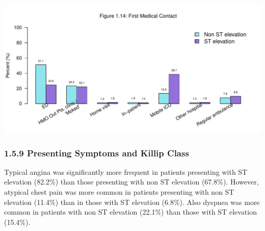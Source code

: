 \documentclass[
]{article}
\begin{document}
\includegraphics{‏‏ACSIS_2024_v1_with_trend_pdf_files/figure-latex/unnamed-chunk-48-1.pdf}

\pagebreak

\subsubsection{1.5.9 Presenting Symptoms and Killip
Class}\label{presenting-symptoms-and-killip-class}

Typical angina was significantly more frequent in patients presenting
with ST elevation (82.2\%) than those presenting with non ST elevation
(67.8\%). However, atypical chest pain was more common in patients
presenting with non ST elevation (11.4\%) than in those with ST
elevation (6.8\%). Also dyspnea was more common in patients with non ST
elevation (22.1\%) than those with ST elevation (15.4\%).

~
\end{document}
